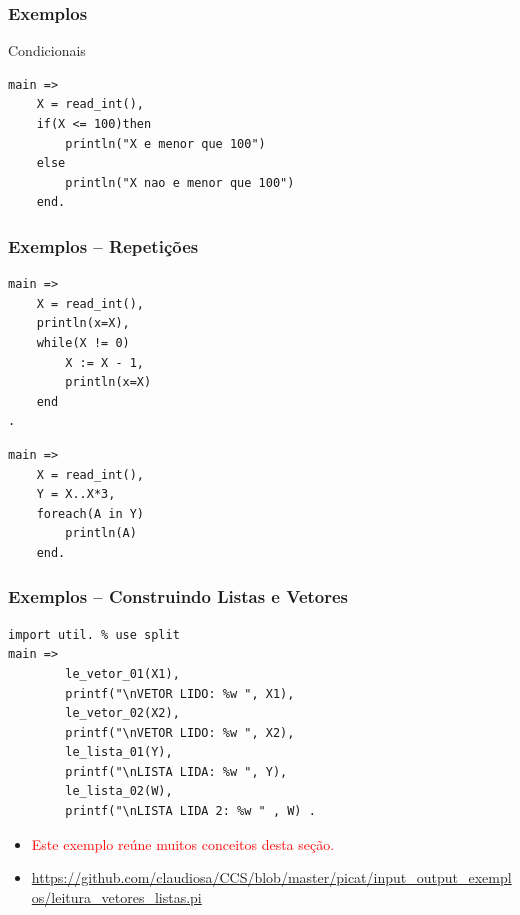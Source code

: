 
\begin{frame}[fragile]

\frametitle{Exemplos}
    
    \begin{block}{Condicionais}
        \begin{lstlisting}[frame=single]
main =>
    X = read_int(),
    if(X <= 100)then
        println("X e menor que 100")
    else
        println("X nao e menor que 100")
    end.
 \end{lstlisting}
    
    \end{block}
\end{frame}

\begin{frame}[fragile]

\frametitle{Exemplos -- Repetições}
    
   \begin{lstlisting}[frame=single]
main =>
    X = read_int(),
    println(x=X),
    while(X != 0)
        X := X - 1,
        println(x=X)
    end
.
   \end{lstlisting}
        
   \begin{lstlisting}[frame=single]
main =>
    X = read_int(),
    Y = X..X*3,
    foreach(A in Y)
        println(A)
    end.
        \end{lstlisting}
    
\end{frame}

\begin{frame}[fragile]
\frametitle{Exemplos -- Construindo  Listas e Vetores}    
       
       
\begin{footnotesize}
\begin{verbatim}
import util. % use split
main => 
        le_vetor_01(X1),
        printf("\nVETOR LIDO: %w ", X1),
        le_vetor_02(X2),
        printf("\nVETOR LIDO: %w ", X2),
        le_lista_01(Y),
        printf("\nLISTA LIDA: %w ", Y),
        le_lista_02(W),
        printf("\nLISTA LIDA 2: %w " , W) .
\end{verbatim}
\end{footnotesize}       

\begin{small}
\begin{itemize}
  \item \textcolor{red}{Este exemplo reúne muitos conceitos desta seção.}  
  \item \textcolor{red}{\url{https://github.com/claudiosa/CCS/blob/master/picat/input_output_exemplos/leitura_vetores_listas.pi}}  
\end{itemize}
\end{small}

\end{frame}


